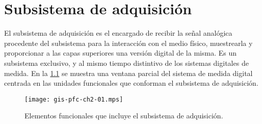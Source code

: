 \chapter{Subsistema de adquisición}

El subsistema de adquisición es el encargado de recibir la señal analógica procedente del subsistema para la interacción con el medio físico, muestrearla y proporcionar a las capas superiores una versión digital de la misma. Es un subsistema exclusivo, y al mismo tiempo distintivo de los sistemas digitales de medida. En la \cref{fig:subacqui} se muestra una ventana parcial del sistema de medida digital centrada en las unidades funcionales que conforman el subsistema de adquisición.\par

\begin{figure}
	\begin{center}
		\texttt{[image: gis-pfc-ch2-01.mps]}
	\end{center}
	\caption[Subsistema de adquisición]{Elementos funcionales que incluye el subsistema de adquisición.}
	\label{fig:subacqui}
\end{figure}

